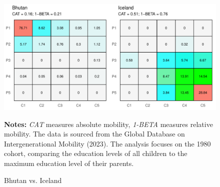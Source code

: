 \begin{figure}[h!]
    \centering
    \includegraphics[width=0.7\linewidth]{figs/compare3.pdf}
    \caption{Bhutan vs. Iceland}
    \label{fig:compare3}
    \begin{minipage}{1\linewidth}
    	\vspace{0.2cm}
    	\footnotesize
    	\textbf{Notes:} \textit{CAT} measures absolute mobility, \textit{1-BETA} measures relative mobility. The data is sourced from the Global Database on Intergenerational Mobility (2023). The analysis focuses on the 1980 cohort, comparing the education levels of all children to the maximum education level of their parents.		
    \end{minipage}
\end{figure}

